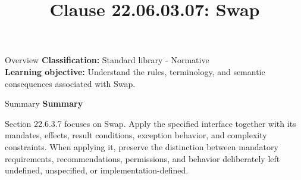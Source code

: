 \documentclass[10pt,letterpaper]{article}
\title{Clause 22.06.03.07: Swap}
\author{}
\date{}
\begin{document}
\maketitle
\begin{CornellOverviewBox}{Overview}
\textbf{Classification:} Standard library - Normative\\[2pt]
\textbf{Learning objective:} Understand the rules, terminology, and semantic consequences associated with Swap.
\end{CornellOverviewBox}\begin{CornellSummaryBox}{Summary}
{\sffamily\bfseries\color{Accent} Summary}\par\vspace{3pt}Section 22.6.3.7 focuses on Swap. Apply the specified interface together with its mandates, effects, result conditions, exception behavior, and complexity constraints. When applying it, preserve the distinction between mandatory requirements, recommendations, permissions, and behavior deliberately left undefined, unspecified, or implementation-defined.
\end{CornellSummaryBox}
\end{document}
